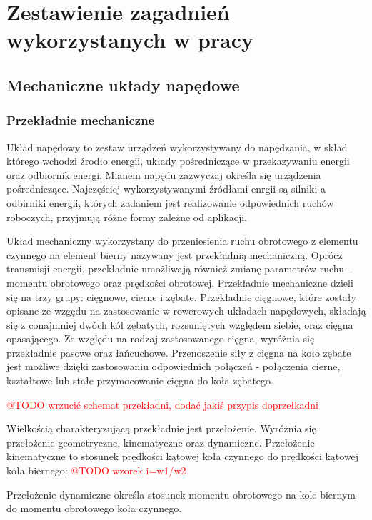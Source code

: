 \chapter{Zestawienie zagadnień wykorzystanych w pracy}
\label{cha:Zestawienie zagadnień wykorzystanych w pracy}

\section{Mechaniczne układy napędowe}
\subsection{Przekładnie mechaniczne}
Układ napędowy to zestaw urządzeń wykorzystywany do napędzania, w skład którego wchodzi źrodło energii, układy pośredniczące w przekazywaniu energii oraz odbiornik energi. Mianem napędu zazwyczaj określa się urządzenia pośredniczące. Najczęściej wykorzystywanymi źródłami enrgii są silniki a odbirniki energii, których zadaniem jest realizowanie odpowiednich ruchów roboczych, przyjmują różne formy zależne od aplikacji.

Układ mechaniczny wykorzystany do przeniesienia ruchu obrotowego z elementu czynnego na element bierny nazywany jest przekładnią mechaniczną. Oprócz transmisji energii, przekładnie umożliwają również zmianę parametrów ruchu - momentu obrotowego oraz prędkości obrotowej. Przekładnie mechaniczne dzieli się na trzy grupy: cięgnowe, cierne i zębate. Przekładnie cięgnowe, które zostały opisane ze wzgędu na zastosowanie w rowerowych układach napędowych, składają się z conajmniej dwóch kół zębatych, rozsuniętych względem siebie, oraz cięgna opasającego. Ze względu na rodzaj zastosowanego cięgna, wyróżnia się przekładnie pasowe oraz łańcuchowe. Przenoszenie siły z cięgna na koło zębate jest możliwe dzięki zastosowaniu odpowiednich połączeń - połączenia cierne, kształtowe lub stałe przymocowanie cięgna do koła zębatego.

\textcolor{red}{@TODO wrzucić schemat przekładni, dodać jakiś przypis doprzełkadni}

Wielkością charakteryzującą przekładnie jest przełożenie. Wyróżnia się przełożenie geometryczne, kinematyczne oraz dynamiczne. Przełożenie kinematyczne to stosunek prędkości kątowej koła czynnego do prędkości kątowej koła biernego:
\textcolor{red}{@TODO wzorek i=w1/w2}

Przełożenie dynamiczne określa stosunek momentu obrotowego na kole biernym do momentu obrotowego koła czynnego.  

